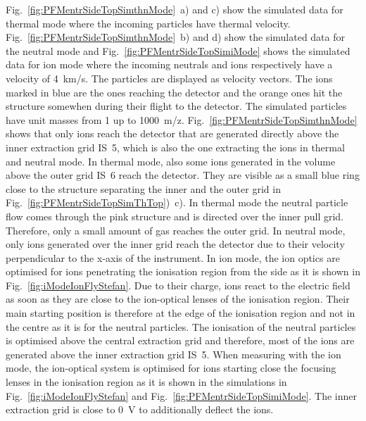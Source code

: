 	Fig.~\ref{fig:PFMentrSideTopSimthnMode}~a) and c) show the simulated data for thermal mode where the incoming particles have thermal velocity. Fig.~\ref{fig:PFMentrSideTopSimthnMode}~b) and d) show the simulated data for the neutral mode and Fig.~\ref{fig:PFMentrSideTopSimiMode} shows the simulated data for ion mode where the incoming neutrals and ions respectively have a velocity of 4~km/s. The particles are displayed as velocity vectors. The ions marked in blue are the ones reaching the detector and the orange ones hit the structure somewhen during their flight to the detector. The simulated particles have unit masses from 1 up to 1000~m/z.	Fig.~\ref{fig:PFMentrSideTopSimthnMode} shows that only ions reach the detector that are generated directly above the inner extraction grid IS~5, which is also the one extracting the ions in thermal and neutral mode. In thermal mode, also some ions generated in the volume above the outer grid IS~6 reach the detector. They are visible as a small blue ring close to the structure separating the inner and the outer grid in Fig.~\ref{fig:PFMentrSideTopSimThTop})~c). In thermal mode the neutral particle flow comes through the pink structure and is directed over the inner pull grid. Therefore, only a small amount of gas reaches the outer grid. In neutral mode, only ions generated over the inner grid reach the detector due to their velocity perpendicular to the x-axis of the instrument. In ion mode, the ion optics are optimised for ions penetrating the ionisation region from the side as it is shown in Fig.~\ref{fig:iModeIonFlyStefan}. Due to their charge, ions react to the electric field as soon as they are close to the ion-optical lenses of the ionisation region. Their main starting position is therefore at the edge of the ionisation region and not in the centre as it is for the neutral particles. The ionisation of the neutral particles is optimised above the central extraction grid and therefore, most of the ions are generated above the inner extraction grid IS~5. When measuring with the ion mode, the ion-optical system is optimised for ions starting close the focusing lenses in the ionisation region as it is shown in the simulations in Fig.~\ref{fig:iModeIonFlyStefan} and Fig.~\ref{fig:PFMentrSideTopSimiMode}. The inner extraction grid is close to 0~V to additionally deflect the ions.\\
